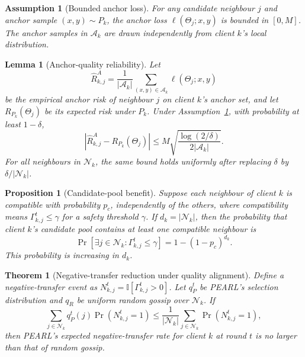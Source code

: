 \documentclass[conference]{IEEEtran}
\newtheorem{assumption}{Assumption}
\newtheorem{lemma}{Lemma}
\newtheorem{proposition}{Proposition}
\newtheorem{theorem}{Theorem}
\begin{document}
\begin{assumption}[Bounded anchor loss]
\label{ass:bounded_anchor_loss}
For any candidate neighbour \(j\) and anchor sample \((x,y)\sim P_k\), the anchor loss \(\ell(\Theta_j;x,y)\) is bounded in \([0,M]\). The anchor samples in \(\mathcal{A}_k\) are drawn independently from client \(k\)'s local distribution.
\end{assumption}

\begin{lemma}[Anchor-quality reliability]
\label{lem:anchor_quality_reliability}
Let
\[
\widehat{R}_{k,j}^{A}
=
\frac{1}{|\mathcal{A}_k|}
\sum_{(x,y)\in\mathcal{A}_k}
\ell(\Theta_j;x,y)
\]
be the empirical anchor risk of neighbour \(j\) on client \(k\)'s anchor set, and let \(R_{P_k}(\Theta_j)\) be its expected risk under \(P_k\). Under Assumption~\ref{ass:bounded_anchor_loss}, with probability at least \(1-\delta\),
\begin{equation*}
\left|
\widehat{R}_{k,j}^{A}
-
R_{P_k}(\Theta_j)
\right|
\leq
M
\sqrt{
\frac{\log(2/\delta)}
{2|\mathcal{A}_k|}
}.
\end{equation*}
For all neighbours in \(\mathcal{N}_k\), the same bound holds uniformly after replacing \(\delta\) by \(\delta/|\mathcal{N}_k|\).
\end{lemma}

\begin{proposition}[Candidate-pool benefit]
\label{prop:candidate_pool_benefit}
Suppose each neighbour of client \(k\) is compatible with probability \(p_c\), independently of the others, where compatibility means \(\Gamma_{k,j}^t\leq\gamma\) for a safety threshold \(\gamma\). If \(d_k=|\mathcal{N}_k|\), then the probability that client \(k\)'s candidate pool contains at least one compatible neighbour is
\begin{equation*}
\Pr\!\left[
\exists j\in\mathcal{N}_k:
\Gamma_{k,j}^t\leq\gamma
\right]
=
1-(1-p_c)^{d_k}.
\end{equation*}
This probability is increasing in \(d_k\).
\end{proposition}

\begin{theorem}[Negative-transfer reduction under quality alignment]
\label{thm:negative_transfer_reduction}
Define a negative-transfer event as \(N_{k,j}^t=\mathbb{I}[\Gamma_{k,j}^t>0]\). Let \(q_P^t\) be PEARL's selection distribution and \(q_R\) be uniform random gossip over \(\mathcal{N}_k\). If
\begin{equation*}
\sum_{j\in\mathcal{N}_k}
q_P^t(j)
\Pr(N_{k,j}^t=1)
\leq
\frac{1}{|\mathcal{N}_k|}
\sum_{j\in\mathcal{N}_k}
\Pr(N_{k,j}^t=1),
\end{equation*}
then PEARL's expected negative-transfer rate for client \(k\) at round \(t\) is no larger than that of random gossip.
\end{theorem}
\end{document}

